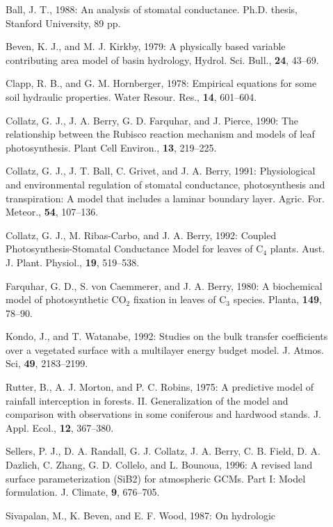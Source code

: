 \begin{description}
 \item[] Ball, J. T., 1988: An analysis of stomatal
	    conductance. Ph.D. thesis, Stanford University, 89 pp. 
 \item[] Beven, K. J., and M. J. Kirkby, 1979: A physically based
	    variable contributing area model of basin hydrology,
	    {Hydrol. Sci. Bull.}, {\bf 24}, 43--69. 
 \item[] Clapp, R. B., and G. M. Hornberger, 1978: Empirical equations
	    for some soil hydraulic properties. {Water Resour. Res.},
	    {\bf 14}, 601--604. 
 \item[] Collatz, G. J., J. A. Berry, G. D. Farquhar, and J. Pierce,
	    1990: The relationship between the Rubisco reaction
	    mechanism and models of leaf photosynthesis. {Plant Cell
	    Environ.}, {\bf 13}, 219--225. 
 \item[] Collatz, G. J., J. T. Ball, C. Grivet, and J. A. Berry, 1991:
	    Physiological and environmental regulation of stomatal
	    conductance, photosynthesis and transpiration: A model that
	    includes a laminar boundary layer. {Agric. For. Meteor.},
	    {\bf 54}, 107--136. 
 \item[] Collatz, G. J., M. Ribas-Carbo, and J. A. Berry, 1992: Coupled
	    Photosynthesis-Stomatal Conductance Model for leaves of
	    C$_4$ plants. {Aust. J. Plant. Physiol.}, {\bf 19},
	    519--538. 
 \item[] Farquhar, G. D., S. von Caemmerer, and J. A. Berry, 1980: A
	    biochemical model of photosynthetic CO$_2$ fixation in
	    leaves of C$_3$ species. {Planta}, {\bf 149}, 78--90.
 \item[] Kondo, J., and T. Watanabe, 1992: Studies on the bulk transfer
	    coefficients over a vegetated surface with a multilayer
	    energy budget model. {J. Atmos. Sci}, {\bf 49}, 2183--2199. 
 \item[] Rutter, B., A. J. Morton, and P. C. Robins, 1975: A predictive
	    model of rainfall interception in forests. II. 
	    Generalization of the model and comparison with observations
	    in some coniferous and hardwood stands. {J. Appl. Ecol.},
	    {\bf 12}, 367--380. 
 \item[] Sellers, P. J., D. A. Randall, G. J. Collatz, J. A. Berry,
	    C. B. Field, D. A. Dazlich, C. Zhang, G. D. Collelo, and
	    L. Bounoua, 1996: A revised land surface parameterization
	    (SiB2) for atmospheric GCMs. Part I: Model formulation.
	    {J. Climate}, {\bf 9}, 676--705. 
 \item[] Sivapalan, M., K. Beven, and E. F. Wood, 1987: On hydrologic

\end{description}
